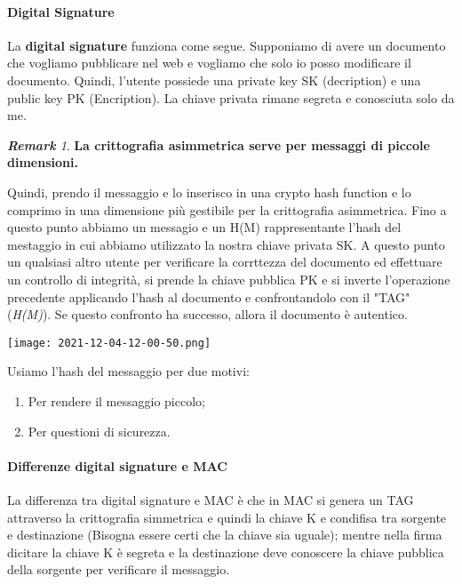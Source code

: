 \documentclass{article}
\theoremstyle{remark}
\newtheorem*{remark}{\textbf{Remark}}
\begin{document}
\paragraph{Digital Signature}
La \textbf{digital signature} funziona come segue. Supponiamo di avere un documento che vogliamo pubblicare nel web e vogliamo che solo io posso modificare il documento. Quindi, l'utente possiede una private key SK (decription) e una public key PK (Encription). La chiave privata rimane segreta e conosciuta solo da me. \begin{remark}
	\textbf{La crittografia asimmetrica serve per messaggi di piccole dimensioni.}
\end{remark}
Quindi, prendo il messaggio e lo inserisco in una crypto hash function e lo comprimo in una dimensione più gestibile per la crittografia asimmetrica. Fino a questo punto abbiamo un messagio e un H(M) rappresentante l'hash del mestaggio in cui abbiamo utilizzato la nostra chiave privata SK.\newline
A questo punto un qualsiasi altro utente per verificare la corrttezza del documento ed effettuare un controllo di integrità, si prende la chiave pubblica PK e si inverte l'operazione precedente applicando l'hash al documento e confrontandolo con il "TAG" (\emph{H(M)}). Se questo confronto ha successo, allora il documento è autentico.
\begin{center}
	\texttt{[image: 2021-12-04-12-00-50.png]}
\end{center}
Usiamo l'hash del messaggio per due motivi:\begin{enumerate}
	\item Per rendere il messaggio piccolo;
	\item Per questioni di sicurezza.
\end{enumerate}
\paragraph{Differenze digital signature e MAC}
La differenza tra digital signature e MAC è che in MAC si genera un TAG attraverso la crittografia simmetrica e quindi la chiave K e condifisa tra sorgente e destinazione (Bisogna essere certi che la chiave sia uguale); mentre nella firma dicitare la chiave K è segreta e la destinazione deve conoscere la chiave pubblica della sorgente per verificare il messaggio.
\end{document}
